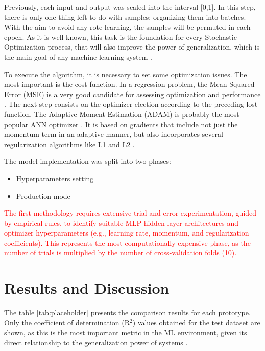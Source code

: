 \documentclass[review]{elsarticle}
\begin{document}
{{Previously, each input and output was scaled into the interval [0,1]. In this step, there is only one thing left to do with samples: organizing them into batches. With the aim to avoid any rote learning, the samples will be permuted in each epoch. As it is well known, this task is the foundation for every Stochastic Optimization process, that will also improve the power of generalization, which is the main goal of any machine learning system \cite{bottou2018optimization}.

To execute the algorithm, it is necessary to set some optimization issues. The most important is the cost function. In a regression problem, the Mean Squared Error (MSE) is a very good candidate for assessing optimization and performance \cite{bishop2006}. The next step consists on the optimizer election according to the preceding lost function. The Adaptive Moment Estimation (ADAM) is probably the most popular ANN optimizer \cite{choi2020survey}. It is based on gradients that include not just the momentum term in an adaptive manner, but also incorporates several regularization algorithms like L1 and L2 \cite{kingma2015adam}.

The model implementation was split into two phases:
\begin{itemize}
    \item Hyperparameters setting
    \item Production mode
\end{itemize}

\textcolor{red}{The first methodology requires extensive trial-and-error experimentation, guided by empirical rules, to identify suitable MLP hidden layer architectures and optimizer hyperparameters (e.g., learning rate, momentum, and regularization coefficients). This represents the most computationally expensive phase, as the number of trials is multiplied by the number of cross-validation folds (10).}  



\section{Results and Discussion}

The table \ref{tab:placeholder} presents the comparison results for each prototype. Only the coefficient of determination (R$^2$) values obtained for the test dataset are shown, as this is the most important metric in the ML environment, given its direct relationship to the generalization power of systems \cite{goodfellow2016deep}.

}}
\end{document}
